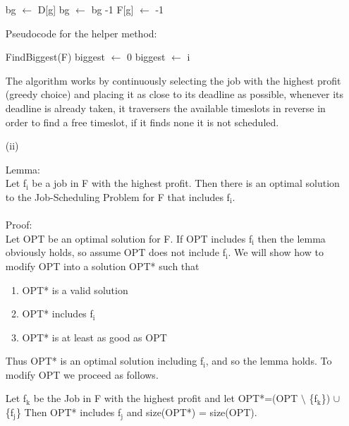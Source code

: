 \documentclass{article}
\newcounter{rcounter}
\newenvironment{rlist}%
{\begin{list}{A.1-\arabic{rcounter}}{\usecounter{rcounter}}}{\end{list}}
\begin{document}
\begin{rlist}
\begin{itemize}
\begin{algorithmic}[1]
\STATE bg $\gets$ D[g]
\STATE bg $\gets$ bg -1
\ENDWHILE
{}
\ENDIF
\STATE F[g] $\gets$ -1
\ENDFOR
{}
\end{algorithmic}	

Pseudocode for the helper method:
\begin{algorithmic}[1]
\STATE FindBiggest(F)
\STATE biggest $\gets$ 0
\STATE biggest $\gets$ i
\ENDIF
{}
\ENDFOR
\end{algorithmic}

The algorithm works by continuously selecting the job with the highest profit (greedy choice) and placing it as close to its deadline as possible, whenever its deadline is already taken, it traversers the available timeslots in reverse in order to find a free timeslot, if it finds none it is not scheduled.

      \item[(ii)] 

Lemma: \\ Let f$_{\text{i}}$ be a job in F with the highest profit. Then there is an optimal solution to the Job-Scheduling Problem for F that includes f$_{\text{i}}$.
\\ \\
Proof: \\
Let OPT be an optimal solution for F. If OPT includes f$_{\text{i}}$ then the lemma obviously holds, so assume OPT does not include f$_{\text{i}}$. 
We will show how to modify OPT into a solution OPT* such that 
\begin{enumerate}
\item{OPT* is a valid solution}
\item{OPT* includes f$_{\text{i}}$}
\item{OPT* is at least as good as OPT}
\end{enumerate}
Thus OPT* is an optimal solution including f$_{\text{i}}$, and so the lemma holds. To modify OPT we proceed as follows. 

Let f$_{\text{k}}$ be the Job in F with the highest profit and let OPT*=(OPT $\setminus$ \{f$_{\text{k}}$\}) $\cup$ \{f$_{\text{j}}$\} Then OPT* includes f$_{\text{j}}$ and size(OPT*) = size(OPT).


\end{itemize}
\end{rlist}
\end{document}

